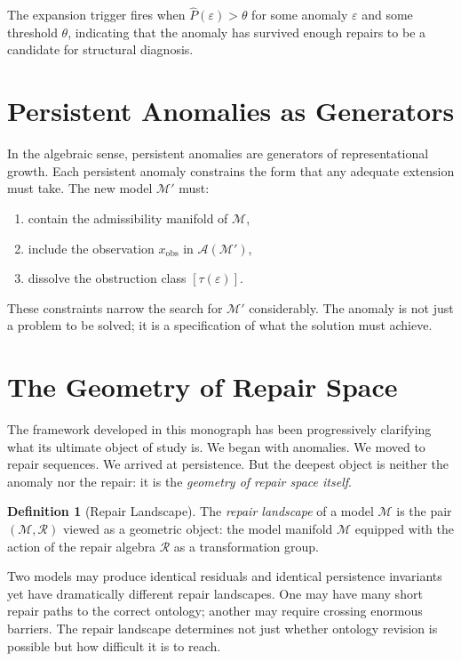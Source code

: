 \documentclass[12pt,oneside]{book}
\theoremstyle{plain}
\theoremstyle{definition}
\newtheorem{definition}[theorem]{Definition}
\theoremstyle{remark}
\newcommand{\R}{\mathcal{R}}
\newcommand{\M}{\mathcal{M}}
\newcommand{\eps}{\varepsilon}
\newcommand{\1}{\mathbf{1}}
\begin{document}
The expansion trigger fires when $\hat{P}(\eps) > \theta$ for some anomaly $\eps$ and some threshold $\theta$, indicating that the anomaly has survived enough repairs to be a candidate for structural diagnosis.

\section{Persistent Anomalies as Generators}

In the algebraic sense, persistent anomalies are generators of representational growth. Each persistent anomaly constrains the form that any adequate extension must take. The new model $\M'$ must:
\begin{enumerate}[label=(\roman*)]
\item contain the admissibility manifold of $\M$,
\item include the observation $x_{\mathrm{obs}}$ in $\mathcal{A}(\M')$,
\item dissolve the obstruction class $[\tau(\eps)]$.
\end{enumerate}

These constraints narrow the search for $\M'$ considerably. The anomaly is not just a problem to be solved; it is a specification of what the solution must achieve.

\section{The Geometry of Repair Space}

The framework developed in this monograph has been progressively clarifying what its ultimate object of study is. We began with anomalies. We moved to repair sequences. We arrived at persistence. But the deepest object is neither the anomaly nor the repair: it is the \emph{geometry of repair space itself}.

\begin{definition}[Repair Landscape]
The \emph{repair landscape} of a model $\M$ is the pair $(\M, \R)$ viewed as a geometric object: the model manifold $\M$ equipped with the action of the repair algebra $\R$ as a transformation group.
\end{definition}

Two models may produce identical residuals and identical persistence invariants yet have dramatically different repair landscapes. One may have many short repair paths to the correct ontology; another may require crossing enormous barriers. The repair landscape determines not just whether ontology revision is possible but how difficult it is to reach.
\end{document}
